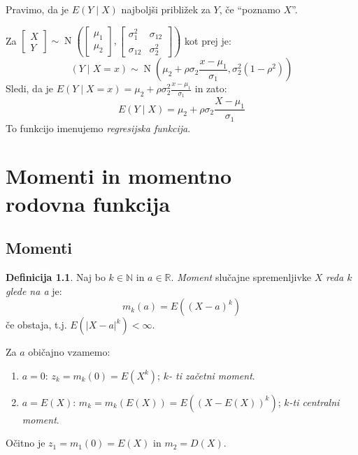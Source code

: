 \documentclass[12pt]{book}
\def\n{\noindent}
\theoremstyle{definition}
\newtheorem{definicija}{Definicija}
\theoremstyle{plain}
\theoremstyle{plain}
\theoremstyle{plain}
\theoremstyle{plain}
\theoremstyle{remark}
\begin{document}
\n Pravimo, da je $E(Y \mid X)$ najboljši približek za $Y$, če “poznamo $X$”. 

\begin{zgled}[nadaljevanje]
    Za $\begin{bmatrix}X \\ Y \end{bmatrix} \sim \operatorname{N}\left(\begin{bmatrix} \mu_1 \\\mu_2 \end{bmatrix}, \begin{bmatrix} \sigma_1^2 & \sigma_{12} \\ \sigma_{12} & \sigma_2^2\end{bmatrix}\right)$ kot prej je:
    $$
    (Y \mid X=x) \sim \operatorname{N}\left(\mu_2+\rho \sigma_2 \frac{x-\mu_1}{\sigma_1}, \sigma_2^2\left(1-\rho^2\right)\right)
    $$
    Sledi, da je $E(Y \mid X=x)=\mu_2+\rho \sigma_2^2 \frac{x-\mu_1}{\sigma_1}$ in zato: 
    $$
    E(Y \mid X)=\mu_2+\rho \sigma_2 \frac{X-\mu_1}{\sigma_1}
    $$
    To funkcijo imenujemo \emph{regresijska funkcija}.
\end{zgled}

\chapter[Momenti in momentno rodovna funkcija]{Momenti in momentno \\ rodovna funkcija}

\section{Momenti}

\begin{definicija}
    Naj bo $k \in \mathbb{N}$ in $a \in \mathbb{R}$. \emph{Moment} slučajne spremenljivke $X$ \emph{reda $k$ glede na a} je:
    $$
    m_k(a)=E\left((X-a)^k\right)
    $$
    če obstaja, t.j. $E\left(|X-a|^k\right)<\infty$.   
\end{definicija}

\n Za $a$ običajno vzamemo: 
\begin{enumerate}
    \item $a=0$: $z_k=m_k(0)=E\left(X^k\right)$; $k$\emph{- ti začetni moment}. 
    \item $a=E(X)$: $m_k=m_k(E(X))=E\left((X-E(X))^k\right)$; $k$\emph{-ti centralni moment}.
\end{enumerate}

\n Očitno je $z_1=m_1(0)=E(X)$ in $m_2=D(X)$. 
\end{document}
